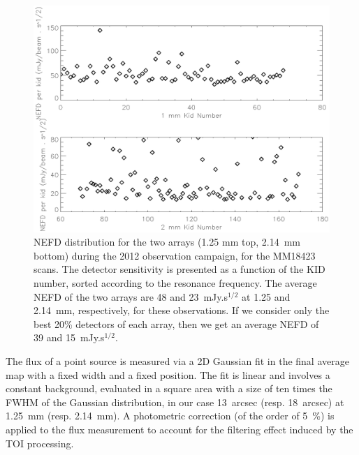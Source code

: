 %
%
%

\begin{figure}[t]
\begin{center}
\includegraphics[scale=0.5,angle=0]{figures/Noise_PerKid_MM18423_20121122_208_216.ps}
\caption{NEFD distribution for the two arrays (1.25 mm
  top, 2.14~mm bottom) during the  2012 observation campaign, for the MM18423 scans. The detector
  sensitivity is presented as a function of the KID number, sorted
  according to the resonance frequency. The average NEFD of the two arrays are
  48 and 23~mJy.s$^{1/2}$ at 1.25 and 2.14~mm, respectively, for these
  observations. If we consider only the best 20\% detectors of each array,
  then we get an average NEFD of 39 and 15~mJy.s$^{1/2}$.}
\label{fig:NEFDrun5}
\end{center}
\end{figure}


The flux of a point source is measured via a 2D Gaussian fit in the final average map with a fixed
width and a fixed position. The fit is linear and
involves a constant background, evaluated in a square area with a size of
ten times the FWHM of the Gaussian distribution, in our case 13~arcsec
(resp. 18~arcsec) at 1.25~mm (resp. 2.14~mm). A photometric correction (of
the order of 5~\%) is applied to the flux measurement to account for the
filtering effect induced by the TOI processing.

